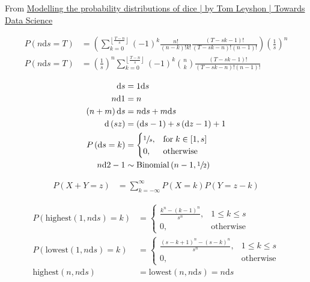 \documentclass{article}
\newcommand\p[1]{\left( #1 \right)}
\renewcommand{\d}{\text{d}}
\begin{document}
From \href{https://towardsdatascience.com/modelling-the-probability-distributions-of-dice-b6ecf87b24ea}
{Modelling the probability distributions of dice | by Tom Leyshon | Towards Data Science}

\begin{align}
    P(n\d s=T) & =\p{\sum_{k=0}^{\left\lfloor \frac{T-n}{s}\right\rfloor}\p{-1}^k\frac{n!}{\p{n-k}!k!}\frac{\p{T-sk-1}!}{\p{T-sk-n}!\p{n-1}!}}\p{\frac{1}{s}}^n \\
    P(n\d s=T) & =\p{\frac{1}{s}}^n\sum_{k=0}^{\left\lfloor \frac{T-n}{s}\right\rfloor}\p{-1}^k{n \choose k}\frac{\p{T-sk-1}!}{\p{T-sk-n}!\p{n-1}!}
\end{align}

\begin{align}
    \d s        & = 1\d s                                                  \\
    n\d 1       & = n                                                      \\
    \p{n+m}\d s & = n\d s + m\d s                                          \\
    \d \p{sz}   & = \p{\d s - 1} + s\p{\d z - 1} + 1                       \\
    P\p{\d s=k} & = \begin{cases}
                        \sfrac{1}{s}, & \text{for}\; k \in \left[ 1, s \right] \\
                        0,            & \text{otherwise}
                    \end{cases} \\
    n\d 2 - 1   & \sim \text{Binomial}\p{n-1, \sfrac{1}{2}}
\end{align}

\begin{align}
    P(X+Y=z) & =\sum_{k=-\infty }^{\infty }P(X=k)P(Y=z-k)
\end{align}

\begin{align}
    P\p{\text{highest}\p{1, n\d s}=k} & = \begin{cases}
                                              \frac{k^n-\p{k-1}^n}{s^n}, & 1\leq k\leq s    \\
                                              0,                         & \text{otherwise}
                                          \end{cases}                      \\
    P\p{\text{lowest}\p{1, n\d s}=k}  & = \begin{cases}
                                              \frac{\p{s-k+1}^n-\p{s-k}^n}{s^n}, & 1\leq k\leq s    \\
                                              0,                                 & \text{otherwise}
                                          \end{cases} \\
    \text{highest}\p{n, n\d s}        & = \text{lowest}\p{n, n\d s} = n\d s
\end{align}
\end{document}
